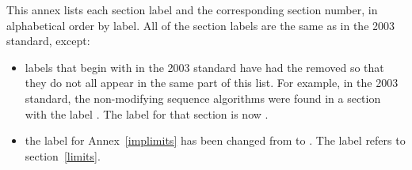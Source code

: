 
This annex lists each section label and the corresponding section number, in
alphabetical order by label. All of the section labels are the same as in the
2003 standard, except:

\begin{itemize}
\item labels that begin with  in the 2003 standard have had the
 removed so that they do not all appear in the same part of this list.
For example, in the 2003 standard, the non-modifying sequence algorithms were found
in a section with the label . The label for that
section is now .
\item the label for Annex~\ref{implimits} has been changed from \tcode{[limits]}
to \tcode{[implimits]}. The label \tcode{[limits]} refers to section~\ref{limits}.
\end{itemize}

